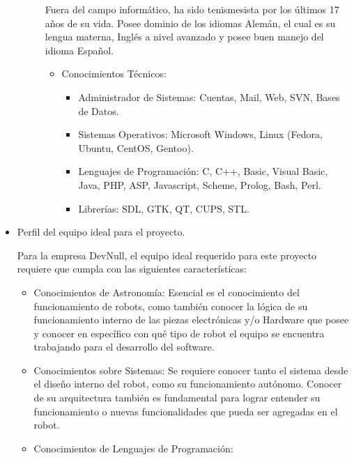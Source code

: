 \documentclass[letterpaper,spanish,10pt]{article}
\begin{document}
\begin{itemize}
\begin{description}
Fuera del campo inform\'atico, ha sido tenismesista por los \'ultimos 17 a\~nos de su vida. Posee dominio de los idiomas Alem\'an, el cual es su lengua materna, Ingl\'es a nivel avanzado y posee buen manejo del idioma Espa\~nol.

                \begin{itemize}
                \item{Conocimientos T\'ecnicos:}
                        \begin{itemize}
                        \item{Administrador de Sistemas:} Cuentas, Mail, Web, SVN, Bases de Datos.
                        \item{Sistemas Operativos:} Microsoft Windows, Linux (Fedora, Ubuntu, CentOS, Gentoo).
                        \item{Lenguajes de Programaci\'on:} C, C++, Basic, Visual Basic, Java, PHP, ASP, Javascript, Scheme, Prolog, Bash, Perl.
                        \item{Librer\'ias:} SDL, GTK, QT, CUPS, STL.
                        \end{itemize}
                \end{itemize}




	\end{description}


	\item Perfil del equipo ideal para el proyecto.

Para la empresa DevNull, el equipo ideal requerido para este proyecto requiere que cumpla con las siguientes caracter\'isticas:


		\begin{itemize}

		\item{Conocimientos de Astronom\'ia:} Esencial es el conocimiento del funcionamiento de robots, como tambi\'en conocer la l\'ogica de su funcionamiento interno de las piezas electr\'onicas y/o Hardware que posee y conocer en espec\'ifico con qu\'e tipo de robot el equipo se encuentra trabajando para el desarrollo del software.
		\item{Conocimientos sobre Sistemas:} Se requiere conocer tanto el sistema desde el dise\~no interno del robot, como su funcionamiento aut\'onomo. Conocer de su arquitectura tambi\'en es fundamental para lograr entender su funcionamiento o nuevas funcionalidades que pueda ser agregadas en el robot.
		\item{Conocimientos de Lenguajes de Programaci\'on:} 
			

\end{itemize}
\end{itemize}
\end{document}

